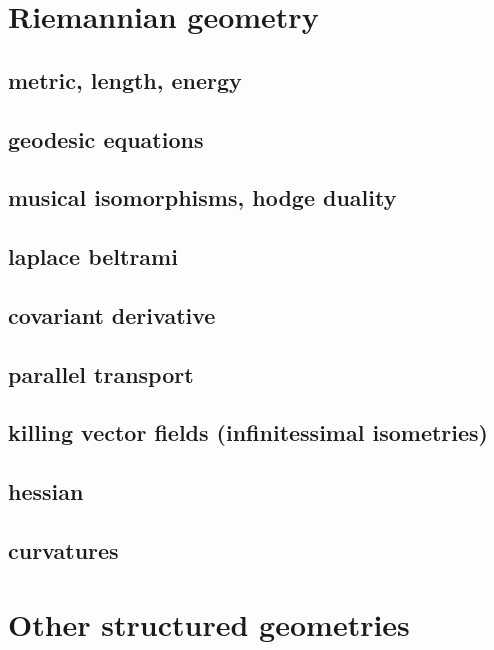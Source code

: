 \clearpage
\section{Riemannian geometry}


\subsection{metric, length, energy}

\subsection{geodesic equations}

\subsection{musical isomorphisms, hodge duality}

\subsection{laplace beltrami}

\subsection{covariant derivative}

\subsection{parallel transport}

\subsection{killing vector fields (infinitessimal isometries)}

\subsection{hessian}

\subsection{curvatures}

\clearpage
\section{Other structured geometries}

